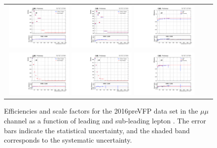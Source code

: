 \begin{figure}[h]
  \begin{center}
    \begin{tabular}{ccc}
      \includegraphics[width=0.32\textwidth]{fig_2016preVFP_TrigSF/g_lepApt_mumu_MC.pdf}
      \includegraphics[width=0.32\textwidth]{fig_2016preVFP_TrigSF/g_lepApt_mumu_data.pdf}
      \includegraphics[width=0.32\textwidth]{fig_2016preVFP_TrigSF/g_mumu_lepApt_FullSystUncBand.pdf}\\
      \includegraphics[width=0.32\textwidth]{fig_2016preVFP_TrigSF/g_lepBpt_mumu_MC.pdf}
      \includegraphics[width=0.32\textwidth]{fig_2016preVFP_TrigSF/g_lepBpt_mumu_data.pdf}
      \includegraphics[width=0.32\textwidth]{fig_2016preVFP_TrigSF/g_mumu_lepBpt_FullSystUncBand.pdf}\\
    \end{tabular}
    \caption{Efficiencies and scale factors for the 2016preVFP data set in the $\mu\mu$ channel as a function of leading and sub-leading lepton \pT.
            The error bars indicate the statistical uncertainty, and the shaded band corresponds to the systematic uncertainty.
            }
    \label{TrigSF_2016preVFP_3}
  \end{center}
\end{figure}


